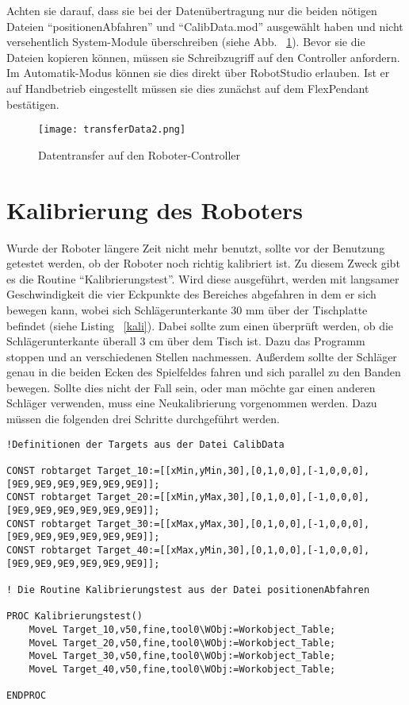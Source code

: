 Achten sie darauf, dass sie bei der Datenübertragung nur die beiden nötigen Dateien \enquote{positionenAbfahren} und \enquote{CalibData.mod} ausgewählt haben und nicht versehentlich System-Module überschreiben (siehe Abb. ~\ref{transfer}). Bevor sie die Dateien kopieren können, müssen sie Schreibzugriff auf den Controller anfordern. Im Automatik-Modus können sie dies direkt über RobotStudio erlauben. Ist er auf Handbetrieb eingestellt müssen sie dies zunächst auf dem FlexPendant bestätigen.

\begin{figure}[htbp]
\centering
\texttt{[image: transferData2.png]}
\caption{Datentransfer auf den Roboter-Controller} 
\label{transfer}
\end{figure}
   

\section{Kalibrierung des Roboters}
Wurde der Roboter längere Zeit nicht mehr benutzt, sollte vor der Benutzung getestet werden, ob der Roboter noch richtig kalibriert ist. Zu diesem Zweck gibt es die Routine \enquote{Kalibrierungstest}. Wird diese ausgeführt, werden mit langsamer Geschwindigkeit die vier Eckpunkte des Bereiches abgefahren in dem er sich bewegen kann, wobei sich Schlägerunterkante 30 mm über der Tischplatte befindet (siehe Listing ~\ref{kali}). Dabei sollte zum einen überprüft werden, ob die Schlägerunterkante überall 3 cm über dem Tisch ist. Dazu das Programm stoppen und an verschiedenen Stellen nachmessen. Außerdem sollte der Schläger genau in die beiden Ecken des Spielfeldes fahren und sich parallel zu den Banden bewegen. Sollte dies nicht der Fall sein, oder man möchte gar einen anderen Schläger verwenden, muss eine Neukalibrierung vorgenommen werden. Dazu müssen die folgenden drei Schritte durchgeführt werden.

\begin{lstlisting}[caption=RAPID-Routine: Kalibrierungstest, label=kali]
!Definitionen der Targets aus der Datei CalibData

CONST robtarget Target_10:=[[xMin,yMin,30],[0,1,0,0],[-1,0,0,0],[9E9,9E9,9E9,9E9,9E9,9E9]];
CONST robtarget Target_20:=[[xMin,yMax,30],[0,1,0,0],[-1,0,0,0],[9E9,9E9,9E9,9E9,9E9,9E9]]; 
CONST robtarget Target_30:=[[xMax,yMax,30],[0,1,0,0],[-1,0,0,0],[9E9,9E9,9E9,9E9,9E9,9E9]];
CONST robtarget Target_40:=[[xMax,yMin,30],[0,1,0,0],[-1,0,0,0],[9E9,9E9,9E9,9E9,9E9,9E9]]; 

! Die Routine Kalibrierungstest aus der Datei positionenAbfahren

PROC Kalibrierungstest()
	MoveL Target_10,v50,fine,tool0\WObj:=Workobject_Table;
   	MoveL Target_20,v50,fine,tool0\WObj:=Workobject_Table;
    MoveL Target_30,v50,fine,tool0\WObj:=Workobject_Table; 
    MoveL Target_40,v50,fine,tool0\WObj:=Workobject_Table; 
        
ENDPROC
\end{lstlisting}

